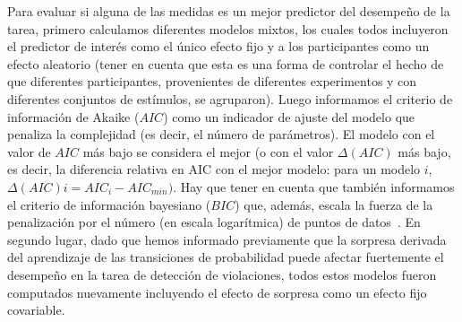  
 

Para evaluar si alguna de las medidas es un mejor predictor del desempeño de la tarea, primero calculamos diferentes modelos mixtos, los cuales todos incluyeron el predictor de interés como el único efecto fijo y a los participantes como un efecto aleatorio (tener en cuenta que esta es una forma de controlar el hecho de que diferentes participantes, provenientes de diferentes experimentos y con diferentes conjuntos de estímulos, se agruparon). Luego informamos el criterio de información de Akaike ($AIC$) como un indicador de ajuste del modelo que penaliza la complejidad (es decir, el número de parámetros). El modelo con el valor de $AIC$ más bajo se considera el mejor (o con el valor $\Delta(AIC)$ más bajo, es decir, la diferencia relativa en AIC con el mejor modelo: para un modelo $i$, $\Delta (AIC) i = AIC_i - AIC_{min})$. Hay que tener en cuenta que también informamos el criterio de información bayesiano ($BIC$) que, además, escala la fuerza de la penalización por el número (en escala logarítmica) de puntos de datos~\cite{f105}. En segundo lugar, dado que hemos informado previamente que la sorpresa derivada del aprendizaje de las transiciones de probabilidad puede afectar fuertemente el desempeño en la tarea de detección de violaciones, todos estos modelos fueron computados nuevamente incluyendo el efecto de sorpresa como un efecto fijo covariable.

